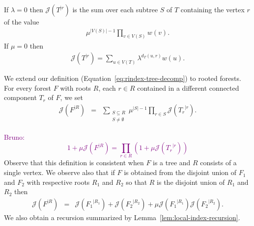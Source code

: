 \documentclass[11 pt]{modarticle}
\newcommand{\wmap}{w}
\newcommand{\size}[1]{|#1|}
\newcommand{\vsetof}[1]{V(#1)}
\newcommand{\distance}[3]{d_{#3}(#1,#2)}
\newcommand{\rtree}[2]{{#1}^{\lvert #2}}
\newcommand{\rindexsymbol}{\mathcal{J}}
\newcommand{\rindex}[2]{\rindexsymbol(\rtree{#2}{#1})}
\newcommand{\bldcomment}[1]{\textcolor{purple}{{\footnotesize Bruno:} #1}}
\begin{document}
\begin{rem}\label{rem:rooted-examples}
If $\lambda = 0$ then $\rindex{r}{T}$ is the sum over each subtree $S$ of $T$ containing the vertex $r$ of the value
\begin{eqnarray*}
	\mu^{\size{\vsetof{S}}-1} \underset{v \in \vsetof{S}}{\prod} \wmap(v).
\end{eqnarray*}
If $\mu = 0$ then
\begin{eqnarray*}
	\rindex{r}{T} = \sum_{u\in \vsetof{T}} \lambda^{\distance{u}{r}{T}} \wmap(u).
\end{eqnarray*}
\end{rem}

We extend our definition (Equation~\eqref{eq:rindex-tree-decomp}) to rooted forests. For every forest $F$ with roots $R$, each $r\in R$ contained in a different connected component $T_r$ of $F$, we set
\begin{eqnarray*}
	\rindex{R}{F} & = & \sum_{\substack{S \subseteq R\\S \neq \emptyset}} \mu^{\size{S} - 1} \underset{r \in S}{\prod} \rindex{r}{T_r}.
\end{eqnarray*}

\bldcomment{
\[ 1 + \mu \rindex{R}{F} =  \prod_{r\in R} (1 + \mu \rindex{r}{T_r})\]
}
Observe that this definition is consistent when $F$ is a tree and $R$ consists of a single vertex. %
We observe also that if $F$ is obtained from the disjoint union of $F_1$ and $F_2$ with respective roots $R_1$ and $R_2$ so that $R$ is the disjoint union of $R_1$ and $R_2$ then
\begin{eqnarray}
	\rindex{R}{F} & = & \rindex{R_1}{F_1} + \rindex{R_2}{F_2} + \mu \rindex{R_1}{F_1} \rindex{R_2}{F_2}. \label{eq:rindex-forest-decomp}
\end{eqnarray}
We also obtain a recursion summarized by Lemma~\ref{lem:local-index-recursion}.
\end{document}

